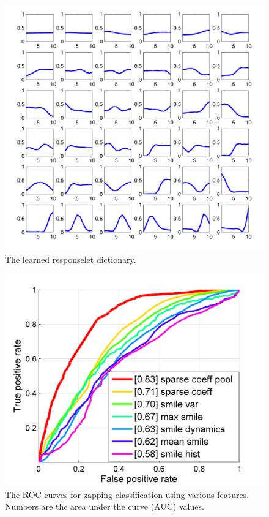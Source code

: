 \documentclass[twoside,leqno,twocolumn]{article}
\begin{document}
\begin{figure}[h]
	\centering
		\includegraphics[width=1\columnwidth]{fig/dict.png}
	\caption{The learned responselet dictionary.}
	\label{fig:dict}
\end{figure}

\begin{figure}[h]
	\centering
		\includegraphics[width=.85\columnwidth]{fig/cls_performance.png}
	\caption{The ROC curves for zapping classification using various features. Numbers are the area under the curve (AUC) values.}
	\label{fig:cls_performance}
\end{figure}
\end{document}
